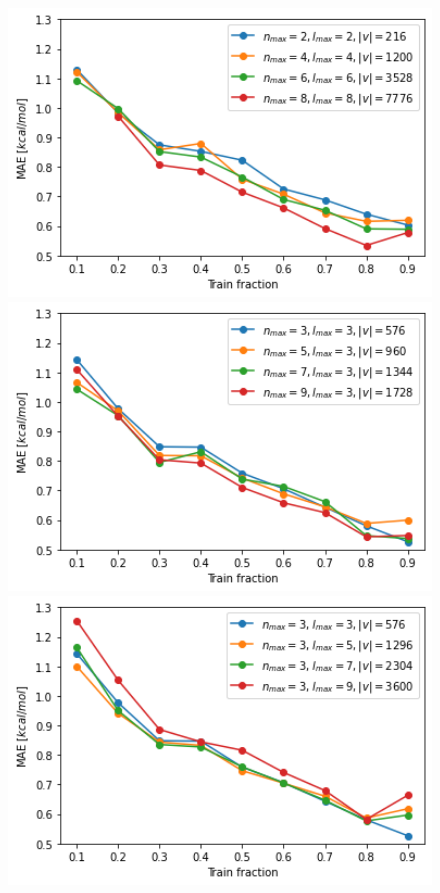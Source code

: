 \begin{figure}[!htb]
    \includegraphics[width=1.0\textwidth]{figures/regression/snap/fixnl.png}
  \endminipage\hfill
    \includegraphics[width=1.0\textwidth]{figures/regression/snap/fixl.png}
  \endminipage\hfill
    \includegraphics[width=1.0\textwidth]{figures/regression/snap/fixn.png}

\end{figure}
